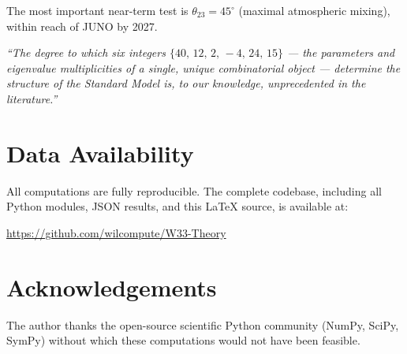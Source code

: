 \documentclass[12pt,a4paper]{article}
\newcommand{\thetaTT}{\theta_{23}}
\begin{document}
The most important near-term test is $\thetaTT = 45^\circ$ (maximal
atmospheric mixing), within reach of JUNO by 2027.

\begin{center}
\textit{``The degree to which six integers
$\{40,\,12,\,2,\,-4,\,24,\,15\}$ ---
the parameters and eigenvalue multiplicities of a single,
unique combinatorial object --- determine the structure of the
Standard Model is, to our knowledge, unprecedented in the
literature.''}
\end{center}

\section*{Data Availability}

All computations are fully reproducible. The complete codebase,
including all Python modules, JSON results, and this \LaTeX{} source,
is available at:
\begin{center}
  \url{https://github.com/wilcompute/W33-Theory}
\end{center}

\section*{Acknowledgements}

The author thanks the open-source scientific Python community
(NumPy, SciPy, SymPy) without which these computations would not
have been feasible.
\end{document}
